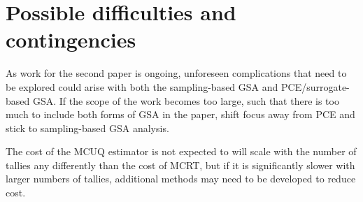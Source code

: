 \section{Possible difficulties and contingencies}
As work for the second paper is ongoing, unforeseen complications that need to be explored could arise with both the sampling-based GSA and PCE/surrogate-based GSA. If the scope of the work becomes too large, such that there is too much to include both forms of GSA in the paper, shift focus away from PCE and stick to sampling-based GSA analysis.

The cost of the MCUQ estimator is not expected to will scale with the number of tallies any differently than the cost of MCRT, but if it is significantly slower with larger numbers of tallies, additional methods may need to be developed to reduce cost.
